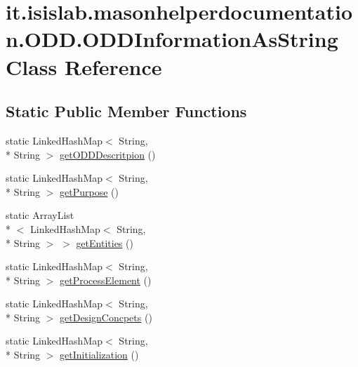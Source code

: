\hypertarget{classit_1_1isislab_1_1masonhelperdocumentation_1_1_o_d_d_1_1_o_d_d_information_as_string}{\section{it.\-isislab.\-masonhelperdocumentation.\-O\-D\-D.\-O\-D\-D\-Information\-As\-String Class Reference}
\label{classit_1_1isislab_1_1masonhelperdocumentation_1_1_o_d_d_1_1_o_d_d_information_as_string}
}
\subsection*{Static Public Member Functions}
\begin{DoxyCompactItemize}
\item 
static Linked\-Hash\-Map$<$ String, \\*
String $>$ \hyperlink{classit_1_1isislab_1_1masonhelperdocumentation_1_1_o_d_d_1_1_o_d_d_information_as_string_a835a31e7097bfac28ea7c07233053355}{get\-O\-D\-D\-Descritpion} ()
\item 
static Linked\-Hash\-Map$<$ String, \\*
String $>$ \hyperlink{classit_1_1isislab_1_1masonhelperdocumentation_1_1_o_d_d_1_1_o_d_d_information_as_string_a5493ca66e02ddcac30133fd53297b1be}{get\-Purpose} ()
\item 
static Array\-List\\*
$<$ Linked\-Hash\-Map$<$ String, \\*
String $>$ $>$ \hyperlink{classit_1_1isislab_1_1masonhelperdocumentation_1_1_o_d_d_1_1_o_d_d_information_as_string_a90dfa63dcbb6e72bc399466689411b73}{get\-Entities} ()
\item 
static Linked\-Hash\-Map$<$ String, \\*
String $>$ \hyperlink{classit_1_1isislab_1_1masonhelperdocumentation_1_1_o_d_d_1_1_o_d_d_information_as_string_a1ede2fd0002cec1a99f554ae57e8149c}{get\-Process\-Element} ()
\item 
static Linked\-Hash\-Map$<$ String, \\*
String $>$ \hyperlink{classit_1_1isislab_1_1masonhelperdocumentation_1_1_o_d_d_1_1_o_d_d_information_as_string_ab296e80354c57e17b9e04f91476f3bb9}{get\-Design\-Concpets} ()
\item 
static Linked\-Hash\-Map$<$ String, \\*
String $>$ \hyperlink{classit_1_1isislab_1_1masonhelperdocumentation_1_1_o_d_d_1_1_o_d_d_information_as_string_add26c98c3f84cb1c6f5ff39db3256842}{get\-Initialization} ()

\end{DoxyCompactItemize}
